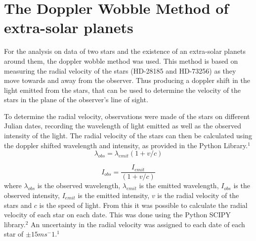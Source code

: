 \documentclass[]{article}
\begin{document}
\section*{The Doppler Wobble Method of extra-solar planets}
\par
For the analysis on data of two stars and the existence of an extra-solar planets 
around them, the doppler wobble method was used. This method is based on measuring the 
radial velocity of the stars (HD-28185 and HD-73256) as they move towards and away from 
the observer. Thus
producing a doppler shift in the light emitted from the stars, that can be used to 
determine the velocity of the stars in the plane of the observer's line of sight. 
\par
To determine the radial velocity, observations were made of the stars on different
Julian dates, recording the wavelength of light emitted as well as the observed intensity 
of the light. The radial velocity of the stars can then be calculated using the doppler
shifted wavelength and intensity, as provided in the Python Library.$^1$ 
\begin{equation}\label{eq:wavelength doppler}\lambda_{obs} = \lambda_{emit}{(1+v/c)}
\end{equation}

\begin{equation}\label{eq:intensity doppler}I_{obs} = \frac{I_{emit}}{(1+v/c)}
\end{equation}
where $\lambda_{obs}$ is the observed wavelength, $\lambda_{emit}$ is the 
emitted wavelength, $I_{obs}$ is the observed intensity, $I_{emit}$ is the emitted 
intensity, $v$ is the radial velocity of the stars and $c$ is the speed of light.
From this it was possible to calculate the radial velocity of each star on each date.
This was done using the Python SCIPY library.$^2$ An uncertainty in the radial velocity
was assigned to each date of each star of $\pm 15 ms^-1$.$^1$
\par
\end{document}
